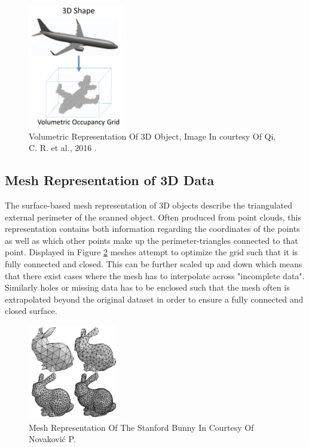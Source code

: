 \documentclass[%
]{USN-MSc}
\begin{document}
\begin{figure}[H]
    \centering
    \includegraphics[width=0.38\textwidth]{fig/3D Volumetric.png}
    \caption{Volumetric Representation Of 3D Object, Image In courtesy Of  Qi, C. R. et al., 2016 \cite{3D-Volumetric}.}
    \label{fig:Volumetric representation of 3D}
\end{figure}


\subsection{Mesh Representation of 3D Data}
\label{ssc:meshes}
The surface-based mesh representation of 3D objects describe the triangulated external perimeter of the scanned object. Often produced from point clouds, this representation contains both information regarding the coordinates of the points as well as which other points make up the perimeter-triangles connected to that point. Displayed in Figure \ref{fig:Stanford Bunny Mesh} meshes attempt to optimize the grid such that it is fully connected and closed. This can be further scaled up and down which means that there exist cases where the mesh has to interpolate across "incomplete data". Similarly holes or missing data has to be enclosed such that the mesh often is extrapolated beyond the original dataset in order to ensure a fully connected and closed surface.

\begin{figure}[H]
    \centering
    \includegraphics[width=0.35\textwidth]{fig/Stanford Bunny Mesh.png}
    \caption{Mesh Representation Of The Stanford Bunny \cite{Stanford-bunny} In Courtesy Of Novaković P.}
    \label{fig:Stanford Bunny Mesh}
\end{figure}
\end{document}
